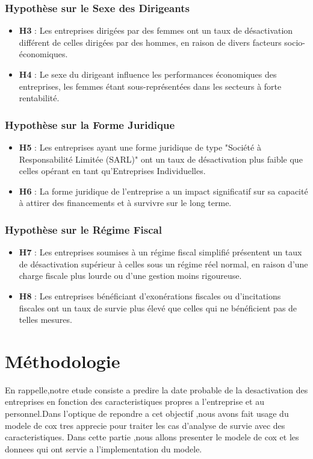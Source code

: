 \documentclass[a4paper,12pt]{report}
\renewcommand\thesection{\Roman{section}}
\begin{document}
\subsection{Hypothèse sur le Sexe des Dirigeants}
\begin{itemize}
    \item \textbf{H3} : Les entreprises dirigées par des femmes ont un taux de désactivation différent de celles dirigées par des hommes, en raison de divers facteurs socio-économiques.
    \item \textbf{H4} : Le sexe du dirigeant influence les performances économiques des entreprises, les femmes étant sous-représentées dans les secteurs à forte rentabilité.
\end{itemize}

\subsection{Hypothèse sur la Forme Juridique}
\begin{itemize}
    \item \textbf{H5} : Les entreprises ayant une forme juridique de type "Société à Responsabilité Limitée (SARL)" ont un taux de désactivation plus faible que celles opérant en tant qu'Entreprises Individuelles.
    \item \textbf{H6} : La forme juridique de l'entreprise a un impact significatif sur sa capacité à attirer des financements et à survivre sur le long terme.
\end{itemize}

\subsection{Hypothèse sur le Régime Fiscal}
\begin{itemize}
    \item \textbf{H7} : Les entreprises soumises à un régime fiscal simplifié présentent un taux de désactivation supérieur à celles sous un régime réel normal, en raison d'une charge fiscale plus lourde ou d'une gestion moins rigoureuse.
    \item \textbf{H8} : Les entreprises bénéficiant d'exonérations fiscales ou d'incitations fiscales ont un taux de survie plus élevé que celles qui ne bénéficient pas de telles mesures.
\end{itemize}

 
\chapter{Méthodologie}
\setcounter{section}{0}  %
\renewcommand\thesection{\Roman{section}} 
En rappelle,notre etude consiste a predire la date probable de la desactivation des entreprises en fonction des caracteristiques propres a l'entreprise et au personnel.Dans l'optique de repondre a cet objectif ,nous avons fait usage du modele de cox tres apprecie pour traiter les cas d'analyse de survie avec des caracteristiques.
Dans cette partie ,nous allons presenter le modele de cox et les donnees qui ont servie a l'implementation du modele.
\end{document}

